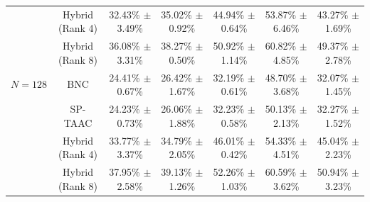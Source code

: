 \documentclass{article}
\theoremstyle{plain}
\theoremstyle{definition}
\theoremstyle{remark}
\begin{document}
\begin{table}[h]
\begin{center}
{\begin{tabular}{lcccccc}
 & Hybrid (Rank 4) & 32.43\% $\pm$ 3.49\% & 35.02\% $\pm$ 0.92\% & 44.94\% $\pm$ 0.64\% & 53.87\% $\pm$ 6.46\% & 43.27\% $\pm$ 1.69\% \\
 & Hybrid (Rank 8) & 36.08\% $\pm$ 3.31\% & 38.27\% $\pm$ 0.50\% & 50.92\% $\pm$ 1.14\% & 60.82\% $\pm$ 4.85\% & 49.37\% $\pm$ 2.78\% \\
\midrule
$N=128$ & BNC & 24.41\% $\pm$ 0.67\% & 26.42\% $\pm$ 1.67\% & 32.19\% $\pm$ 0.61\% & 48.70\% $\pm$ 3.68\% & 32.07\% $\pm$ 1.45\% \\
 & SP-TAAC & 24.23\% $\pm$ 0.73\% & 26.06\% $\pm$ 1.88\% & 32.23\% $\pm$ 0.58\% & 50.13\% $\pm$ 2.13\% & 32.27\% $\pm$ 1.52\% \\
 & Hybrid (Rank 4) & 33.77\% $\pm$ 3.37\% & 34.79\% $\pm$ 2.05\% & 46.01\% $\pm$ 0.42\% & 54.33\% $\pm$ 4.51\% & 45.04\% $\pm$ 2.23\% \\
 & Hybrid (Rank 8) & 37.95\% $\pm$ 2.58\% & 39.13\% $\pm$ 1.26\% & 52.26\% $\pm$ 1.03\% & 60.59\% $\pm$ 3.62\% & 50.94\% $\pm$ 3.23\% \\
\bottomrule
\end{tabular}
}
\end{center}
\vskip -0.1in
\end{table}
\end{document}
